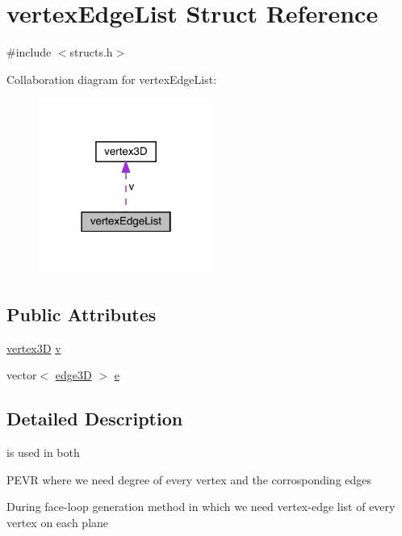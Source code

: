 \hypertarget{structvertex_edge_list}{}\section{vertex\+Edge\+List Struct Reference}
\label{structvertex_edge_list}


{\ttfamily \#include $<$structs.\+h$>$}



Collaboration diagram for vertex\+Edge\+List\+:
\nopagebreak
\begin{figure}[H]
\begin{center}
\leavevmode
\includegraphics[width=162pt]{structvertex_edge_list__coll__graph}
\end{center}
\end{figure}
\subsection*{Public Attributes}
\begin{DoxyCompactItemize}
\item 
\mbox{\hyperlink{structvertex3_d}{vertex3D}} \mbox{\hyperlink{structvertex_edge_list_a28c924e4d346635bfaa382c499e7788d}{v}}
\item 
vector$<$ \mbox{\hyperlink{structedge3_d}{edge3D}} $>$ \mbox{\hyperlink{structvertex_edge_list_a9de414e6a9e7df61810b5b2adbc2ac4d}{e}}
\end{DoxyCompactItemize}


\subsection{Detailed Description}
is used in both
\begin{DoxyEnumerate}
\item P\+E\+VR where we need degree of every vertex and the corrosponding edges
\item During face-\/loop generation method in which we need vertex-\/edge list of every vertex on each plane 
\end{DoxyEnumerate}

